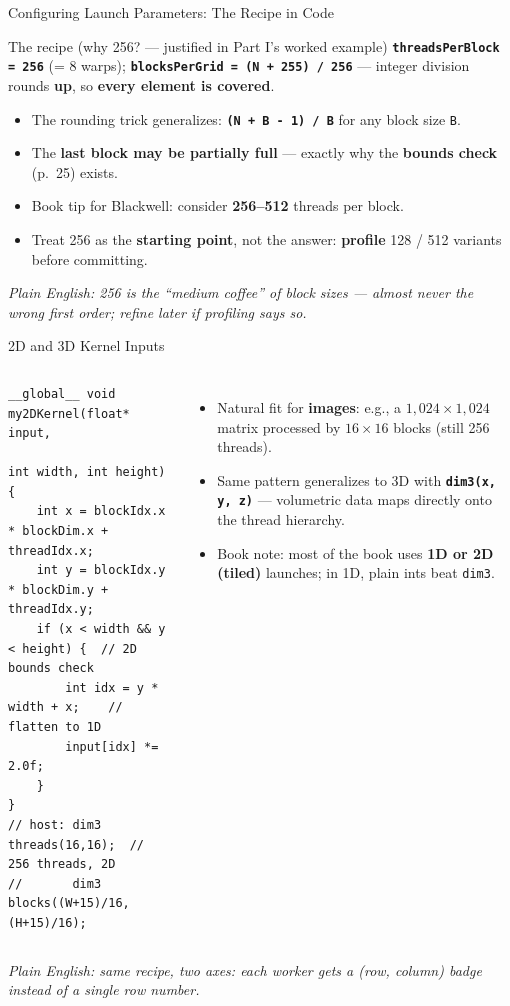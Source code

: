 \documentclass[aspectratio=169]{beamer}
\newcommand{\kw}[1]{\textbf{\textcolor{kwblue}{#1}}}
\newcommand{\pe}[1]{\par{\setlength{\fboxsep}{2.5pt}\noindent\colorbox{navy!9}{\parbox{\dimexpr\textwidth-5pt\relax}{\footnotesize\itshape Plain English: #1}}}}
\begin{document}
\begin{frame}{Configuring Launch Parameters: The Recipe in Code}
  \begin{block}{The recipe (why 256? --- justified in Part I's worked example)}
    \kw{\texttt{threadsPerBlock = 256}} (= 8 warps);\quad
    \kw{\texttt{blocksPerGrid = (N + 255) / 256}} --- integer division rounds \kw{up},
    so \kw{every element is covered}.
  \end{block}
  \begin{itemize}
    \item The rounding trick generalizes: \kw{\texttt{(N + B - 1) / B}} for any block size \texttt{B}.
    \item The \kw{last block may be partially full} --- exactly why the
          \kw{bounds check} (p.~25) exists.
    \item Book tip for Blackwell: consider \kw{256--512} threads per block.
    \item Treat 256 as the \kw{starting point}, not the answer:
          \kw{profile} 128 / 512 variants before committing.
  \end{itemize}
  \pe{256 is the ``medium coffee'' of block sizes --- almost never the wrong first order; refine later if profiling says so.}
\end{frame}
\begin{frame}[fragile]{2D and 3D Kernel Inputs}
  \begin{columns}[t]
\begin{lstlisting}
__global__ void my2DKernel(float* input,
                           int width, int height) {
    int x = blockIdx.x * blockDim.x + threadIdx.x;
    int y = blockIdx.y * blockDim.y + threadIdx.y;
    if (x < width && y < height) {  // 2D bounds check
        int idx = y * width + x;    // flatten to 1D
        input[idx] *= 2.0f;
    }
}
// host: dim3 threads(16,16);  // 256 threads, 2D
//       dim3 blocks((W+15)/16, (H+15)/16);
\end{lstlisting}
    \begin{itemize}
      \item Natural fit for \kw{images}: e.g., a $1{,}024 \times 1{,}024$ matrix processed by
            $16 \times 16$ blocks (still 256 threads).
      \item Same pattern generalizes to 3D with \kw{\texttt{dim3(x, y, z)}} ---
            volumetric data maps directly onto the thread hierarchy.
      \item Book note: most of the book uses \kw{1D or 2D (tiled)} launches;
            in 1D, plain ints beat \texttt{dim3}.
    \end{itemize}
  \end{columns}
  \pe{same recipe, two axes: each worker gets a (row, column) badge instead of a single row number.}
\end{frame}
\end{document}
